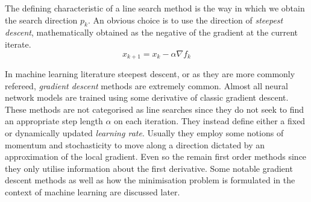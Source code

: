 \documentclass{article}
\begin{document}
    The defining characteristic of a line search method is the way in which we obtain the search direction $p_k$.
    An obvious choice is to use the direction of \textit{steepest descent}, mathematically obtained as the negative of the gradient at the current iterate.
    \begin{equation}
        x_{k+1} = x_k - \alpha \nabla f_k
    \end{equation}

    In machine learning literature steepest descent, or as they are more commonly refereed, \textit{gradient descent} methods are extremely common.
    Almost all neural network models are trained using some derivative of classic gradient descent.
    These methods are not categorised as line searches since they do not seek to find an appropriate step length $\alpha$ on each iteration.
    They instead define either a fixed or dynamically updated \textit{learning rate}.
    Usually they employ some notions of momentum and stochasticity to move along a direction dictated by an approximation of the local gradient.
    Even so the remain first order methods since they only utilise information about the first derivative.
    Some notable gradient descent methods as well as how the minimisation problem is formulated in the context of machine learning are discussed later.
\end{document}
